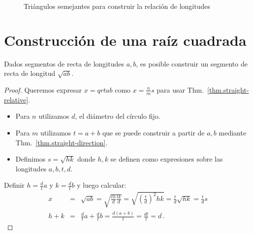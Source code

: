 {\begin{figure}[t]
\begin{center}
\end{center}
\caption{Triángulos semejantes para construir la relación de longitudes}\label{f.se-three2}
\end{figure}

\section{Construcción de una raíz cuadrada}\label{s.root}

\begin{theorem}\label{thm.straight-sqrt}
Dados segmentos de recta de longitudes $a,b$, es posible construir un segmento de recta de longitud $\sqrt{ab}$.
\end{theorem}

\begin{proof}
Queremos expresar $x=qrt{ab}$ como $x=\displaystyle\frac{n}{m}s$ para usar Thm.~\ref{thm.straight-relative}.
\begin{itemize}
\setlength{\itemsep}{0pt}
\item Para $n$ utilizamos $d$, el diámetro del círculo fijo.
\item Para $m$ utilizamos $t=a+b$ que se puede construir a partir de $a,b$ mediante Thm.~\ref{thm.straight-direction}.
\item Definimos $s=\sqrt{hk}$ donde $h,k$ se definen como expresiones sobre las longitudes $a,b,t,d$.
\end{itemize}
Definir $h=\displaystyle\frac{d}{t}a$ y $k=\displaystyle\frac{d}{t}b$ y luego calcular:
\begin{eqnarray*}
x&=&\sqrt{ab}=\sqrt{\frac{th}{d}\frac{tk}{d}}=\sqrt{\left(\frac{t}{d}\right)^2hk}=\frac{t}{d}\sqrt{hk}=\frac{t}{d}s\\
h+k &=& \frac{d}{t}a + \frac{d}{t}b = \frac{d(a+b)}{t} = \frac{dt}{t} = d\,.
\end{eqnarray*}


\end{proof}}
